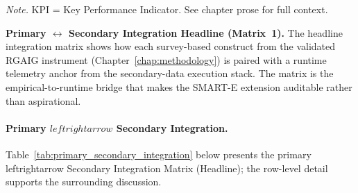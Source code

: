 \vspace{0.3em}\noindent\textit{Note.} KPI = Key Performance Indicator. See chapter prose for full context.

\noindent\textbf{Primary $\leftrightarrow$ Secondary Integration Headline (Matrix~1).} The headline integration matrix shows how each survey-based construct from the validated RGAIG instrument (Chapter~\ref{chap:methodology}) is paired with a runtime telemetry anchor from the secondary-data execution stack. The matrix is the empirical-to-runtime bridge that makes the SMART-E extension auditable rather than aspirational.

\paragraph{Primary $leftrightarrow$ Secondary Integration.}
\noindent Table~\ref{tab:primary_secondary_integration} below presents the primary leftrightarrow Secondary Integration Matrix (Headline); the row-level detail supports the surrounding discussion.



